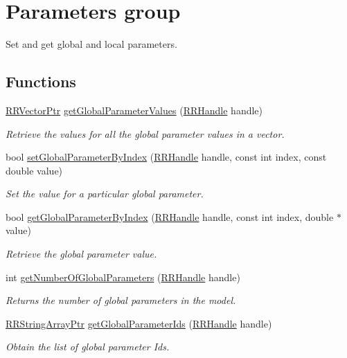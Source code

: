 \hypertarget{group__parameters}{\section{Parameters group}
\label{group__parameters}
}


Set and get global and local parameters.  


\subsection*{Functions}
\begin{DoxyCompactItemize}
\item 
\hyperlink{rrc__types_8h_a3be72d6006034fd349f753d2bf441bf7}{R\+R\+Vector\+Ptr} \hyperlink{group__parameters_ga3add5376f5242d85532074605e19f38c}{get\+Global\+Parameter\+Values} (\hyperlink{rrc__types_8h_a1d68f0592372208fa5a5f2799ea4b3ae}{R\+R\+Handle} handle)
\begin{DoxyCompactList}\small\item\em Retrieve the values for all the global parameter values in a vector. \end{DoxyCompactList}\item 
bool \hyperlink{group__parameters_gaf53b31742420ec60079ca65c62a65801}{set\+Global\+Parameter\+By\+Index} (\hyperlink{rrc__types_8h_a1d68f0592372208fa5a5f2799ea4b3ae}{R\+R\+Handle} handle, const int index, const double value)
\begin{DoxyCompactList}\small\item\em Set the value for a particular global parameter. \end{DoxyCompactList}\item 
bool \hyperlink{group__parameters_ga87c8b1dbb74786c677502d34ecfd19ba}{get\+Global\+Parameter\+By\+Index} (\hyperlink{rrc__types_8h_a1d68f0592372208fa5a5f2799ea4b3ae}{R\+R\+Handle} handle, const int index, double $\ast$value)
\begin{DoxyCompactList}\small\item\em Retrieve the global parameter value. \end{DoxyCompactList}\item 
int \hyperlink{group__parameters_ga3c5874112e8cd770fdeff634261b1740}{get\+Number\+Of\+Global\+Parameters} (\hyperlink{rrc__types_8h_a1d68f0592372208fa5a5f2799ea4b3ae}{R\+R\+Handle} handle)
\begin{DoxyCompactList}\small\item\em Returns the number of global parameters in the model. \end{DoxyCompactList}\item 
\hyperlink{rrc__types_8h_a7c9475df6c7337d99482b13a365e7596}{R\+R\+String\+Array\+Ptr} \hyperlink{group__parameters_ga75b8b7b950a89fce030cbc0120051e90}{get\+Global\+Parameter\+Ids} (\hyperlink{rrc__types_8h_a1d68f0592372208fa5a5f2799ea4b3ae}{R\+R\+Handle} handle)
\begin{DoxyCompactList}\small\item\em Obtain the list of global parameter Ids. \end{DoxyCompactList}\end{DoxyCompactItemize}


